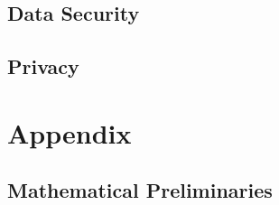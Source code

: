 \documentclass{book}
\begin{document}
  \chapter{Data Security}
    


  \chapter{Privacy}

%
%  

\part{Appendix}

\appendix

\chapter{Mathematical Preliminaries}\label{sec:math}


\tocentryBib


%
%
\end{document}
